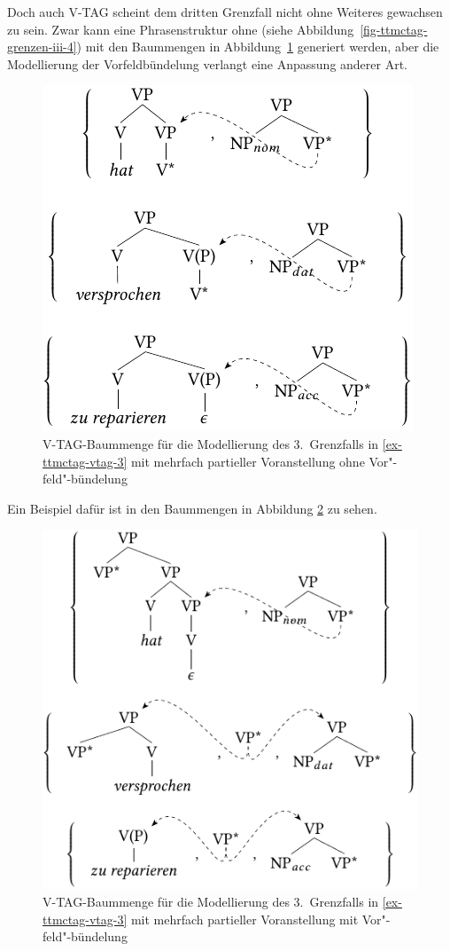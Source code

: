 Doch auch V-TAG scheint dem dritten Grenzfall nicht ohne Weiteres gewachsen zu sein. Zwar kann eine Phrasenstruktur ohne  (siehe Abbildung~\ref{fig-ttmctag-grenzen-iii-4}) mit den Baummengen in Abbildung~\ref{fig-ttmctag-vtag-3}  generiert werden, aber die Modellierung der Vorfeldbündelung verlangt eine Anpassung anderer Art. 
\begin{figure}[t]
\centering
\includegraphics{graphics/abb743.pdf}
\caption{\label{fig-ttmctag-vtag-3}V-TAG-Baummenge für die Modellierung des 3.\ Grenzfalls in \ref{ex-ttmctag-vtag-3} mit mehrfach partieller Voranstellung ohne Vor"-feld"-bündelung}
\end{figure}
Ein Beispiel dafür ist in den Baummengen in Abbildung \ref{fig-ttmctag-vtag-4} zu sehen.
\begin{figure}[t]
\centering
\includegraphics{graphics/abb744.pdf}
\caption{\label{fig-ttmctag-vtag-4}V-TAG-Baummenge für die Modellierung des 3.~Grenzfalls in \ref{ex-ttmctag-vtag-3} mit mehrfach partieller Voranstellung mit Vor"-feld"-bündelung}
\end{figure}
